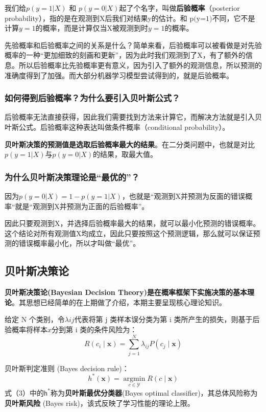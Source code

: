我们给$p(y=1|X)$  和   $p(y=0|X)$起了个名字，叫做\textbf{后验概率}（posterior probability），指的是在观测到X后我们对结果y的估计。和 $\text{p(y=1)}$不同，它不是计算$y=1$的概率，而是计算仅当X被观测到时$y=1$的概率。

先验概率和后验概率之间的关系是什么？简单来看，后验概率可以被看做是对先验概率的一种“更加细致的刻画和更新”，因为此时我们观测到了X，有了额外的信息。所以后验概率比先验概率更有意义，因为引入了额外的观测信息，所以预测的准确度得到了加强。而大部分机器学习模型尝试得到的，就是后验概率。

\subsubsection{如何得到后验概率？为什么要引入贝叶斯公式？}
后验概率无法直接获得，因此我们需要找到方法来计算它，而解决方法就是引入贝叶斯公式。后验概率这种表达叫做条件概率（conditional probability）。

\textbf{贝叶斯决策的预测值是选取后验概率最大的结果}。在二分类问题中，也就是对比$p(y=1|X)\text{与}p(y=0|X)$的结果，取最大值。
\subsubsection{为什么贝叶斯决策理论是“最优的”？}
因为$p(y=0|X)=1-p(y=1|X)$，也就是“观测到X并预测为反面的错误概率“就是“观测到X并预测为正面的后验概率”。

因此只要观测到X，并选择后验概率最大的结果，就可以最小化预测的错误概率。这个结论对所有观测值X均成立，因此只要按照这个预测逻辑，那么就可以保证预测的错误概率最小化，所以才叫做“最优”。

\subsection{贝叶斯决策论}
\textbf{贝叶斯决策论(Bayesian Decision Theory)是在概率框架下实施决策的基本理论}。其思想已经简单的在上期做了介绍，本期主要呈现核心理论知识。

给定 N 个类别，令$\lambda ij$代表将第 j 类样本误分类为第 i 类所产生的损失，则基于后验概率将样本$x$分到第 i 类的条件风险为： 
\begin{equation}R(c_i\mid\boldsymbol{x})=\sum_{j=1}^N\lambda_{ij}P(c_j\mid\boldsymbol{x})\end{equation}

贝叶斯判定准则 (Bayes decision rule)： 
\begin{equation}h^*(\boldsymbol{x})=\underset{c\in\mathcal{Y}}{\operatorname*{\arg\min}}R(c\mid\boldsymbol{x})\end{equation}
式（3）中的$\mathsf{h}^{*}$称为\textbf{贝叶斯最优分类器}(Bayes optimal classifier)，其总体风险称为\textbf{
贝叶斯风险} (Bayes risk)，该式反映了学习性能的理论上限。

